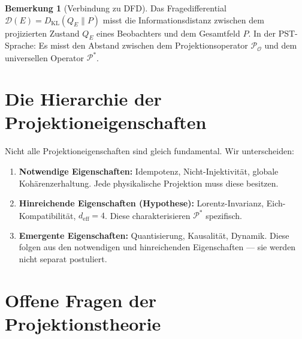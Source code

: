 \documentclass[11pt,a4paper]{article}
\theoremstyle{plain}
\theoremstyle{definition}
\newtheorem{remark}{Bemerkung}[section]
\newcommand{\deff}{d_{\mathrm{eff}}}
\newcommand{\Proj}{\mathcal{P}}
\begin{document}
\begin{remark}[Verbindung zu DFD]
Das Fragedifferential $\mathcal{D}(E) = D_{\mathrm{KL}}(Q_E \| P)$
misst die Informationsdistanz zwischen dem projizierten Zustand $Q_E$
eines Beobachters und dem Gesamtfeld $P$. In der PST-Sprache: Es misst
den \glqq{}Abstand\grqq{} zwischen dem Projektionsoperator
$\Proj_{\mathcal{O}}$ und dem universellen Operator $\Proj^\ast$.
\end{remark}

\section{Die Hierarchie der Projektioneigenschaften}

Nicht alle Projektioneigenschaften sind gleich fundamental. Wir
unterscheiden:

\begin{enumerate}
  \item \textbf{Notwendige Eigenschaften:} Idempotenz, Nicht-Injektivit\"{a}t,
        globale Koh\"{a}renzerhaltung. Jede physikalische Projektion
        muss diese besitzen.
  \item \textbf{Hinreichende Eigenschaften (Hypothese):} Lorentz-Invarianz,
        Eich-Kompatibilit\"{a}t, $\deff = 4$. Diese charakterisieren
        $\Proj^\ast$ spezifisch.
  \item \textbf{Emergente Eigenschaften:} Quantisierung, Kausalit\"{a}t,
        Dynamik. Diese folgen aus den notwendigen und hinreichenden
        Eigenschaften --- sie werden nicht separat postuliert.
\end{enumerate}

\section{Offene Fragen der Projektionstheorie}
\end{document}
